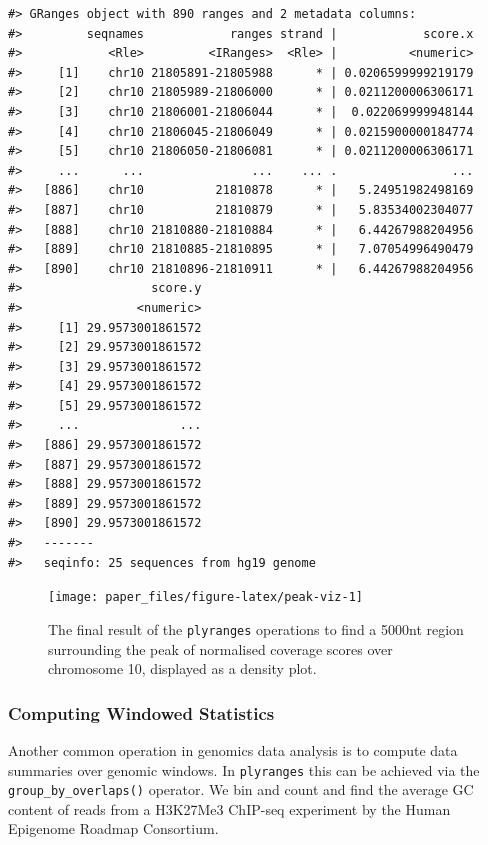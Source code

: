 \documentclass[]{article}
\begin{document}
\begin{verbatim}
#> GRanges object with 890 ranges and 2 metadata columns:
#>         seqnames            ranges strand |            score.x
#>            <Rle>         <IRanges>  <Rle> |          <numeric>
#>     [1]    chr10 21805891-21805988      * | 0.0206599999219179
#>     [2]    chr10 21805989-21806000      * | 0.0211200006306171
#>     [3]    chr10 21806001-21806044      * |  0.022069999948144
#>     [4]    chr10 21806045-21806049      * | 0.0215900000184774
#>     [5]    chr10 21806050-21806081      * | 0.0211200006306171
#>     ...      ...               ...    ... .                ...
#>   [886]    chr10          21810878      * |   5.24951982498169
#>   [887]    chr10          21810879      * |   5.83534002304077
#>   [888]    chr10 21810880-21810884      * |   6.44267988204956
#>   [889]    chr10 21810885-21810895      * |   7.07054996490479
#>   [890]    chr10 21810896-21810911      * |   6.44267988204956
#>                  score.y
#>                <numeric>
#>     [1] 29.9573001861572
#>     [2] 29.9573001861572
#>     [3] 29.9573001861572
#>     [4] 29.9573001861572
#>     [5] 29.9573001861572
#>     ...              ...
#>   [886] 29.9573001861572
#>   [887] 29.9573001861572
#>   [888] 29.9573001861572
#>   [889] 29.9573001861572
#>   [890] 29.9573001861572
#>   -------
#>   seqinfo: 25 sequences from hg19 genome
\end{verbatim}

\begin{figure}

{\centering \texttt{[image: paper\_files/figure-latex/peak-viz-1]} 

}

\caption{The final result of the \texttt{plyranges} operations to find a 5000nt region surrounding the peak of normalised coverage scores over chromosome 10, displayed as a density plot.}\label{fig:peak-viz}
\end{figure}

\hypertarget{computing-windowed-statistics}{%
\subsubsection{Computing Windowed
Statistics}\label{computing-windowed-statistics}}

Another common operation in genomics data analysis is to compute data
summaries over genomic windows. In \texttt{plyranges} this can be
achieved via the \texttt{group\_by\_overlaps()} operator. We bin and
count and find the average GC content of reads from a H3K27Me3 ChIP-seq
experiment by the Human Epigenome Roadmap Consortium.
\end{document}
